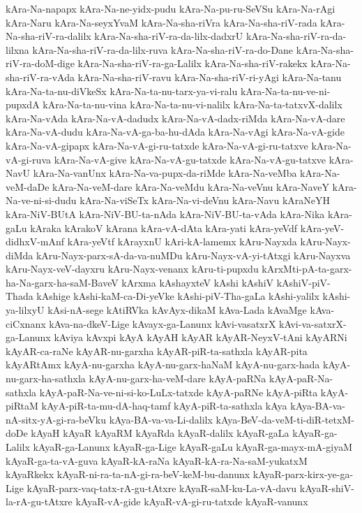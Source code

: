{kAra-Na-napapx
kAra-Na-ne-yidx-pudu
kAra-Na-pu-ru-SeVSu
kAra-Na-rAgi
kAra-Naru
kAra-Na-seyxYvaM
kAra-Na-sha-riVra
kAra-Na-sha-riV-rada
kAra-Na-sha-riV-ra-dalilx
kAra-Na-sha-riV-ra-da-lilx-dadxrU
kAra-Na-sha-riV-ra-da-lilxna
kAra-Na-sha-riV-ra-da-lilx-ruva
kAra-Na-sha-riV-ra-do-Dane
kAra-Na-sha-riV-ra-doM-dige
kAra-Na-sha-riV-ra-ga-Lalilx
kAra-Na-sha-riV-rakekx
kAra-Na-sha-riV-ra-vAda
kAra-Na-sha-riV-ravu
kAra-Na-sha-riV-ri-yAgi
kAra-Na-tanu
kAra-Na-ta-nu-diVkeSx
kAra-Na-ta-nu-tarx-ya-vi-ralu
kAra-Na-ta-nu-ve-ni-pupxdA
kAra-Na-ta-nu-vina
kAra-Na-ta-nu-vi-nalilx
kAra-Na-ta-tatxvX-dalilx
kAra-Na-vAda
kAra-Na-vA-dadudx
kAra-Na-vA-dadx-riMda
kAra-Na-vA-dare
kAra-Na-vA-dudu
kAra-Na-vA-ga-ba-hu-dAda
kAra-Na-vAgi
kAra-Na-vA-gide
kAra-Na-vA-gipapx
kAra-Na-vA-gi-ru-tatxde
kAra-Na-vA-gi-ru-tatxve
kAra-Na-vA-gi-ruva
kAra-Na-vA-give
kAra-Na-vA-gu-tatxde
kAra-Na-vA-gu-tatxve
kAra-NavU
kAra-Na-vanUnx
kAra-Na-va-pupx-da-riMde
kAra-Na-veMba
kAra-Na-veM-daDe
kAra-Na-veM-dare
kAra-Na-veMdu
kAra-Na-veVnu
kAra-NaveY
kAra-Na-ve-ni-si-dudu
kAra-Na-viSeTx
kAra-Na-vi-deVnu
kAra-Navu
kAraNeYH
kAra-NiV-BUtA
kAra-NiV-BU-ta-nAda
kAra-NiV-BU-ta-vAda
kAra-Nika
kAra-gaLu
kAraka
kArakoV
kArana
kAra-vA-dAta
kAra-yati
kAra-yeVdf
kAra-yeV-didhxV-mAnf
kAra-yeVtf
kArayxnU
kAri-kA-lamemx
kAru-Nayxda
kAru-Nayx-diMda
kAru-Nayx-parx-sA-da-va-nuMDu
kAru-Nayx-vA-yi-tAtxgi
kAru-Nayxva
kAru-Nayx-veV-dayxru
kAru-Nayx-venanx
kAru-ti-pupxdu
kArxMti-pA-ta-garx-ha-Na-garx-ha-saM-BaveV
kArxma
kAshayxteV
kAshi
kAshiV
kAshiV-piV-Thada
kAshige
kAshi-kaM-ca-Di-yeVke
kAshi-piV-Tha-gaLa
kAshi-yalilx
kAshi-ya-lilxyU
kAsi-nA-sege
kAtiRVka
kAvAyx-dikaM
kAva-Lada
kAvaMge
kAva-ciCxnanx
kAva-na-dkeV-Lige
kAvayx-ga-Lanunx
kAvi-vasatxrX
kAvi-va-satxrX-ga-Lanunx
kAviya
kAvxpi
kAyA
kAyAH
kAyAR
kAyAR-NeyxV-tAni
kAyARNi
kAyAR-ca-raNe
kAyAR-nu-garxha
kAyAR-piR-ta-sathxla
kAyAR-pita
kAyARtAmx
kAyA-nu-garxha
kAyA-nu-garx-haNaM
kAyA-nu-garx-hada
kAyA-nu-garx-ha-sathxla
kAyA-nu-garx-ha-veM-dare
kAyA-paRNa
kAyA-paR-Na-sathxla
kAyA-paR-Na-ve-ni-si-ko-LuLx-tatxde
kAyA-paRNe
kAyA-piRta
kAyA-piRtaM
kAyA-piR-ta-mu-dA-haq-tamf
kAyA-piR-ta-sathxla
kAya
kAya-BA-va-nA-sitx-yA-gi-ra-beVku
kAya-BA-va-va-Li-dalilx
kAya-BeV-da-veM-ti-diR-tetxM-doDe
kAyaH
kAyaR
kAyaRM
kAyaRda
kAyaR-dalilx
kAyaR-gaLa
kAyaR-ga-Lalilx
kAyaR-ga-Lanunx
kAyaR-ga-Lige
kAyaR-gaLu
kAyaR-ga-mayx-mA-giyaM
kAyaR-ga-ta-vA-guva
kAyaR-kA-raNa
kAyaR-kA-ra-Na-saM-yukatxM
kAyaRkekx
kAyaR-ni-ra-ta-nA-gi-ra-beV-keM-bu-danunx
kAyaR-parx-kirx-ye-ga-Lige
kAyaR-parx-vaq-tatx-rA-gu-tAtxre
kAyaR-saM-ku-La-vA-davu
kAyaR-shiV-la-rA-gu-tAtxre
kAyaR-vA-gide
kAyaR-vA-gi-ru-tatxde
kAyaR-vanunx
}
